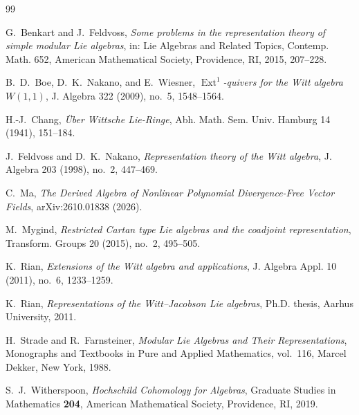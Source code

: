 \documentclass[11pt,reqno]{amsart}
\theoremstyle{definition}
\theoremstyle{remark}
\theoremstyle{definition}
\newcommand{\Ext}{\operatorname{Ext}}
\begin{document}
\begin{thebibliography}{99}

G.~Benkart and J.~Feldvoss,
\emph{Some problems in the representation theory of simple modular Lie
algebras},
in: Lie Algebras and Related Topics,
Contemp. Math. 652, American Mathematical Society, Providence, RI, 2015,
207--228.

B.~D.~Boe, D.~K.~Nakano, and E.~Wiesner,
\emph{$\Ext^1$-quivers for the Witt algebra $W(1,1)$},
J. Algebra 322 (2009), no.~5, 1548--1564.

H.-J.~Chang,
\emph{\"Uber Wittsche Lie-Ringe},
Abh. Math. Sem. Univ. Hamburg 14 (1941), 151--184.

J.~Feldvoss and D.~K.~Nakano,
\emph{Representation theory of the Witt algebra},
J. Algebra 203 (1998), no.~2, 447--469.

C.~Ma,
\emph{The Derived Algebra of Nonlinear Polynomial Divergence-Free Vector
Fields}, arXiv:2610.01838 (2026).

M.~Mygind,
\emph{Restricted Cartan type Lie algebras and the coadjoint representation},
Transform. Groups 20 (2015), no.~2, 495--505.

K.~Rian,
\emph{Extensions of the Witt algebra and applications},
J. Algebra Appl. 10 (2011), no.~6, 1233--1259.

K.~Rian,
\emph{Representations of the Witt--Jacobson Lie algebras},
Ph.D. thesis, Aarhus University, 2011.

H.~Strade and R.~Farnsteiner,
\emph{Modular Lie Algebras and Their Representations},
Monographs and Textbooks in Pure and Applied Mathematics, vol.~116,
Marcel Dekker, New York, 1988.

S.~J.~Witherspoon,
\emph{Hochschild Cohomology for Algebras},
Graduate Studies in Mathematics \textbf{204},
American Mathematical Society, Providence, RI, 2019.

\end{thebibliography}
\end{document}
